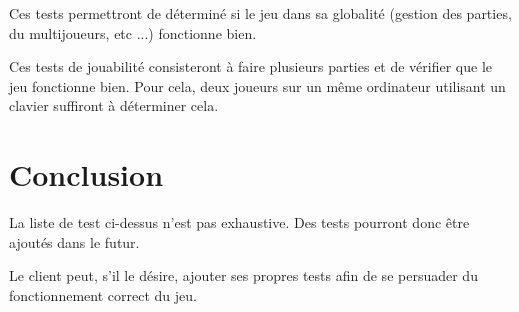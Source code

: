 Ces tests permettront de déterminé si le jeu dans sa globalité (gestion des parties, du multijoueurs, etc ...) fonctionne bien.

Ces tests de jouabilité consisteront à faire plusieurs parties et de vérifier que le jeu fonctionne bien. Pour cela, deux joueurs sur un même ordinateur utilisant un clavier suffiront à déterminer cela.

\newpage

\section*{Conclusion}

La liste de test ci-dessus n'est pas exhaustive. Des tests pourront donc être ajoutés dans le futur.

Le client peut, s'il le désire, ajouter ses propres tests afin de se persuader du fonctionnement correct du jeu.
